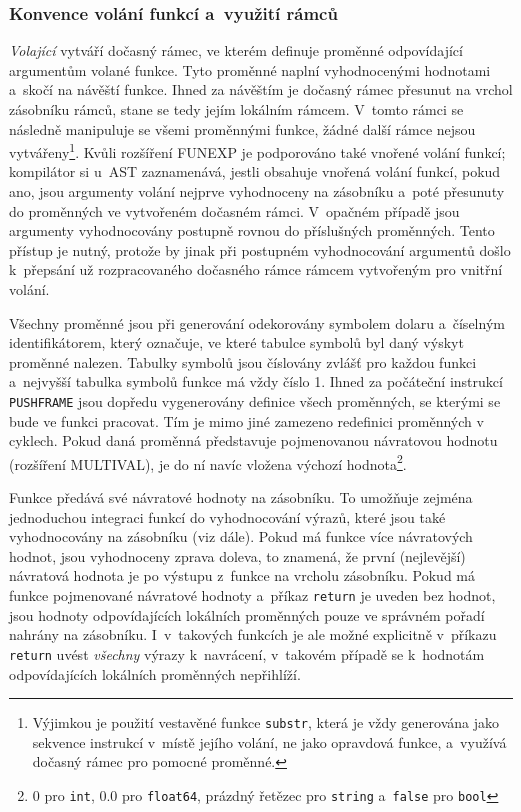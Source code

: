 \documentclass[11pt]{article}
\begin{document}
\subsubsection{Konvence volání funkcí a~využití rámců}
\label{sec:konvence_volani}

\emph{Volající} vytváří dočasný rámec, ve kterém definuje proměnné odpovídající argumentům volané funkce. Tyto proměnné naplní vyhodnocenými hodnotami a~skočí na návěští funkce. Ihned za návěštím je dočasný rámec přesunut na vrchol zásobníku rámců, stane se tedy jejím lokálním rámcem. V~tomto rámci se následně manipuluje se všemi proměnnými funkce, žádné další rámce nejsou vytvářeny\footnote{Výjimkou je použití vestavěné funkce \texttt{substr}, která je vždy generována jako sekvence instrukcí v~místě jejího volání, ne jako opravdová funkce, a~využívá dočasný rámec pro pomocné proměnné.}. Kvůli rozšíření FUNEXP je podporováno také vnořené volání funkcí; kompilátor si u~AST zaznamenává, jestli obsahuje vnořená volání funkcí, pokud ano, jsou argumenty volání nejprve vyhodnoceny na zásobníku a~poté přesunuty do proměnných ve vytvořeném dočasném rámci. V~opačném případě jsou argumenty vyhodnocovány postupně rovnou do příslušných proměnných. Tento přístup je nutný, protože by jinak při postupném vyhodnocování argumentů došlo k~přepsání už rozpracovaného dočasného rámce rámcem vytvořeným pro vnitřní volání.

Všechny proměnné jsou při generování odekorovány symbolem dolaru a~číselným identifikátorem, který označuje, ve které tabulce symbolů byl daný výskyt proměnné nalezen. Tabulky symbolů jsou číslovány zvlášť pro každou funkci a~nejvyšší tabulka symbolů funkce má vždy číslo 1. Ihned za počáteční instrukcí \texttt{PUSHFRAME} jsou dopředu vygenerovány definice všech proměnných, se kterými se bude ve funkci pracovat. Tím je mimo jiné zamezeno redefinici proměnných v cyklech. Pokud daná proměnná představuje pojmenovanou návratovou hodnotu (rozšíření MULTIVAL), je do ní navíc vložena výchozí hodnota\footnote{0 pro \texttt{int}, 0.0 pro \texttt{float64}, prázdný řetězec pro \texttt{string} a~\texttt{false} pro \texttt{bool}}.

Funkce předává své návratové hodnoty na zásobníku. To umožňuje zejména jednoduchou integraci funkcí do vyhodnocování výrazů, které jsou také vyhodnocovány na zásobníku (viz dále). Pokud má funkce více návratových hodnot, jsou vyhodnoceny zprava doleva, to znamená, že první (nejlevější) návratová hodnota je po výstupu z~funkce na vrcholu zásobníku. Pokud má funkce pojmenované návratové hodnoty a~příkaz \texttt{return} je uveden bez hodnot, jsou hodnoty odpovídajících lokálních proměnných pouze ve správném pořadí nahrány na zásobníku. I~v~takových funkcích je ale možné explicitně v~příkazu \texttt{return} uvést \emph{všechny} výrazy k~navrácení, v~takovém případě se k~hodnotám odpovídajících lokálních proměnných nepřihlíží.
\end{document}
